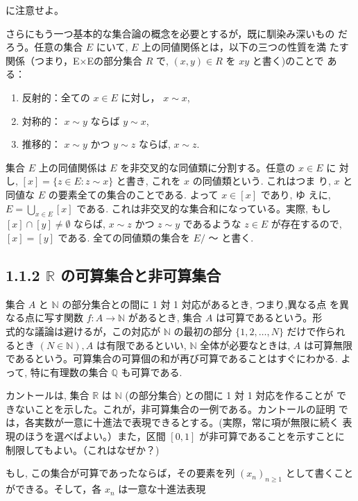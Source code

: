 \documentclass[14pt]{jsarticle}
\begin{document}
に注意せよ。

さらにもう一つ基本的な集合論の概念を必要とするが，既に馴染み深いもの だろう。任意の集合 $E$ にいて, $E$ 上の同値関係とは，以下の三つの性質を満 たす関係（つまり，E×Eの部分集合 $R$ で, $(x, y) \in R$ を $x y$ と書く)のことで ある：

\begin{enumerate}
  \item 反射的：全ての $x \in E$ に対し， $x \sim x$,

  \item 対称的： $x \sim y$ ならば $y \sim x$,

  \item 推移的： $x \sim y$ かつ $y \sim z$ ならば, $x \sim z$.

\end{enumerate}

集合 $E$ 上の同値関係は $E$ を非交叉的な同値類に分割する。任意の $x \in E$ に 対し, $[x]=\{z \in E: z \sim x\}$ と書き, これを $x$ の同値類という. これはつま り, $x$ と同値な $E$ の要素全ての集合のことである. よって $x \in[x]$ であり, ゆ えに, $E=\bigcup_{x \in E}[x]$ である. これは非交叉的な集合和になっている。実際, もし $[x] \cap[y] \neq \emptyset$ ならば, $x \sim z$ かつ $z \sim y$ であるような $z \in E$ が存在するので, $[x]=[y]$ である. 全ての同値類の集合を $E /$ 〜 と書く.

\subsection*{1.1.2 $\mathbb{R}$ の可算集合と非可算集合}
集合 $A$ と $\mathbb{N}$ の部分集合との間に 1 対 1 対応があるとき, つまり,異なる点 を異なる点に写す関数 $f: A \rightarrow \mathbb{N}$ があるとき, 集合 $A$ は可算であるという。形\\
式的な議論は避けるが，この対応が $\mathbb{N}$ の最初の部分 $\{1,2, \ldots, N\}$ だけで作られ るとき $(N \in \mathbb{N}), A$ は有限であるといい, $\mathbb{N}$ 全体が必要なときは, $A$ は可算無限であるという。可算集合の可算個の和が再び可算であることはすぐにわかる. よって, 特に有理数の集合 $\mathbb{Q}$ も可算である.

カントールは, 集合 $\mathbb{R}$ は $\mathbb{N}$ (の部分集合) との間に 1 対 1 対応を作ることが できないことを示した。これが，非可算集合の一例である。カントールの証明 では，各実数が一意に十進法で表現できるとする。(実際，常に項が無限に続く 表現のほうを選べばよい。）また，区間 $[0,1]$ が非可算であることを示すことに 制限してもよい。（これはなぜか？)

もし, この集合が可算であったならば，その要素を列 $\left(x_{n}\right)_{n \geq 1}$ として書くこと ができる。そして，各 $x_{n}$ は一意な十進法表現
\end{document}
